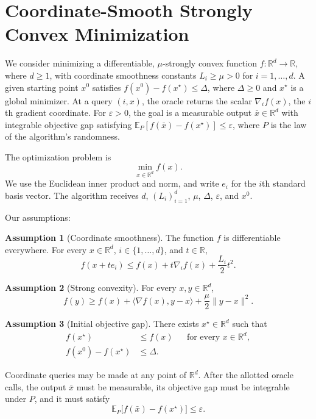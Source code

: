 \documentclass[10pt]{article}
\theoremstyle{definition}
\newtheorem{assumption}{Assumption}
\begin{document}
\section*{Coordinate-Smooth Strongly Convex Minimization}
We consider minimizing a differentiable, $\mu$-strongly convex function $f:\mathbb{R}^d\to\mathbb{R}$, where $d\geq1$, with coordinate smoothness constants $L_i\geq\mu>0$ for $i=1,\ldots,d$. A given starting point $x^0$ satisfies $f(x^0)-f(x^\star)\leq\Delta$, where $\Delta\geq0$ and $x^\star$ is a global minimizer. At a query $(i,x)$, the oracle returns the scalar $\nabla_i f(x)$, the $i$th gradient coordinate. For $\varepsilon>0$, the goal is a measurable output $\bar{x}\in\mathbb{R}^d$ with integrable objective gap satisfying $\mathbb{E}_{P}[f(\bar{x})-f(x^\star)]\leq\varepsilon$, where $P$ is the law of the algorithm's randomness.

The optimization problem is
\[
\min_{x\in\mathbb{R}^d} f(x).
\]
We use the Euclidean inner product and norm, and write $e_i$ for the $i$th standard basis vector. The algorithm receives $d$, $(L_i)_{i=1}^d$, $\mu$, $\Delta$, $\varepsilon$, and $x^0$.

Our assumptions:
\begin{assumption}[Coordinate smoothness]
The function $f$ is differentiable everywhere. For every $x\in\mathbb{R}^d$, $i\in\{1,\ldots,d\}$, and $t\in\mathbb{R}$,
\[
f(x+t e_i)\leq f(x)+t\nabla_i f(x)+\frac{L_i}{2}t^2.
\]
\end{assumption}

\begin{assumption}[Strong convexity]
For every $x,y\in\mathbb{R}^d$,
\[
f(y)\geq f(x)+\langle\nabla f(x),y-x\rangle
+\frac{\mu}{2}\|y-x\|^2.
\]
\end{assumption}

\begin{assumption}[Initial objective gap]
There exists $x^\star\in\mathbb{R}^d$ such that
\[
\begin{aligned}
f(x^\star)&\leq f(x) &&\text{for every }x\in\mathbb{R}^d,\\
f(x^0)-f(x^\star)&\leq\Delta.
\end{aligned}
\]
\end{assumption}

Coordinate queries may be made at any point of $\mathbb{R}^d$. After the allotted oracle calls, the output $\bar{x}$ must be measurable, its objective gap must be integrable under $P$, and it must satisfy
\[
\mathbb{E}_{P}\bigl[f(\bar{x})-f(x^\star)\bigr]\leq\varepsilon.
\]
\end{document}
